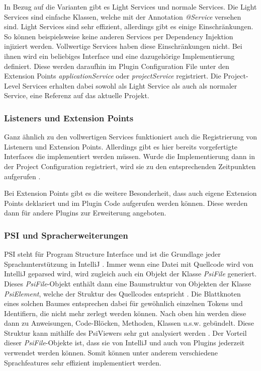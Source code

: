   In Bezug auf die Varianten gibt es Light Services und normale Services.
  Die Light Services sind einfache Klassen, welche mit der Annotation \emph{@Service}
  versehen sind. Light Services sind sehr effizient, allerdings gibt es einige Einschränkungen.
  So können beispielsweise keine anderen Services per Dependency Injektion injiziert werden.
  Vollwertige Services haben diese Einschränkungen nicht. Bei ihnen wird ein beliebiges Interface und
  eine dazugehörige Implementierung definiert. Diese werden daraufhin im Plugin Configuration File
  unter den Extension Points \emph{applicationService} oder \emph{projectService} registriert.
  Die Project-Level Services erhalten dabei sowohl als Light Service als auch als normaler Service, 
  eine Referenz auf das aktuelle Projekt.

\subsubsection{Listeners und Extension Points}

  Ganz ähnlich zu den vollwertigen Services funktioniert auch die Registrierung von Listenern
  und Extension Points. Allerdings gibt es hier bereits vorgefertigte Interfaces die implementiert
  werden müssen. Wurde die Implementierung dann in der Project Configuration registriert, wird
  sie zu den entsprechenden Zeitpunkten aufgerufen 
  \cite{IntelliJPlatformSDKExtensionPoints,IntelliJPlatformSDKListeners}.
  
  Bei Extension Points gibt es die weitere Besonderheit, dass auch eigene Extension Points deklariert
  und im Plugin Code aufgerufen werden können. Diese werden dann für andere Plugins zur Erweiterung
  angeboten.

\subsubsection{PSI und Spracherweiterungen}

  PSI steht für Program Structure Interface und ist die Grundlage jeder Sprachunterstützung in
  IntelliJ \cite{IntelliJPlatformSDKPSI}. 
  Immer wenn eine Datei mit Quellcode wird von IntelliJ geparsed wird, wird zugleich auch ein
  Objekt der Klasse \emph{PsiFile} generiert. 
  Dieses \emph{PsiFile}-Objekt enthält dann eine Baumstruktur von Objekten der Klasse
  \emph{PsiElement}, welche der Struktur des Quellcodes entspricht 
  \cite{IntelliJPlatformSDKPSIFiles,IntelliJPlatformSDKPSIElements}. 
  Die Blattknoten eines solchen Baumes entsprechen dabei
  für gewöhnlich einzelnen Tokens und Identifiern, die nicht mehr zerlegt werden können.
  Nach oben hin werden diese dann zu Anweisungen, Code-Blöcken, Methoden, Klassen u.s.w. gebündelt.
  Diese Struktur kann mithilfe des PsiViewers sehr gut analysiert werden 
  \cite{IntelliJPlatformSDKPsiViewer}.
  Der Vorteil dieser \emph{PsiFile}-Objekte ist, dass sie von IntelliJ und auch von Plugins jederzeit
  verwendet werden können. Somit können unter anderem verschiedene Sprachfeatures sehr
  effizient implementiert werden.

